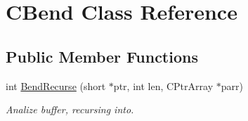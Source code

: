 \hypertarget{class_c_bend}{\section{C\-Bend Class Reference}
\label{class_c_bend}
}
\subsection*{Public Member Functions}
\begin{DoxyCompactItemize}
\item 
int \hyperlink{class_c_bend_a25c3433dfba49395915d32d6d3bd1546}{Bend\-Recurse} (short $\ast$ptr, int len, C\-Ptr\-Array $\ast$parr)
\begin{DoxyCompactList}\small\item\em Analize buffer, recursing into. \end{DoxyCompactList}\end{DoxyCompactItemize}
